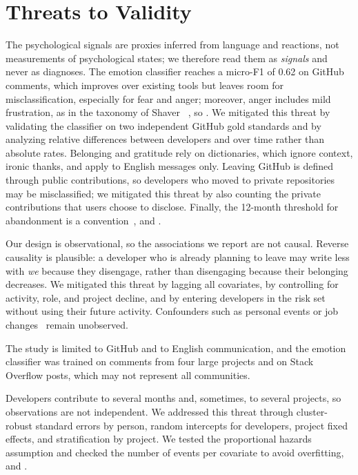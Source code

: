 \section{Threats to Validity}
\label{sec:ttv}
\begin{description}[leftmargin=0.3cm]
\item[Construct Validity.] The psychological signals are proxies inferred from language and reactions, not measurements of psychological states; we therefore read them as \textit{signals} and never as diagnoses. The emotion classifier reaches a micro-F1 of 0.62 on GitHub comments, which improves over existing tools but leaves room for misclassification, especially for fear and anger; moreover, anger includes mild frustration, as in the taxonomy of Shaver \etal~\cite{shaver1987emotion}, so . We mitigated this threat by validating the classifier on two independent GitHub gold standards and by analyzing relative differences between developers and over time rather than absolute rates. Belonging and gratitude rely on dictionaries, which ignore context, \eg ironic thanks, and apply to English messages only. Leaving GitHub is defined through public contributions, so developers who moved to private repositories may be misclassified; we mitigated this threat by also counting the private contributions that users choose to disclose. Finally, the 12-month threshold for abandonment is a convention~\cite{calefato2022will}, and .

\item[Internal Validity.] Our design is observational, so the associations we report are not causal. Reverse causality is plausible: a developer who is already planning to leave may write less with \textit{we} because they disengage, rather than disengaging because their belonging decreases. We mitigated this threat by lagging all covariates, by controlling for activity, role, and project decline, and by entering developers in the risk set without using their future activity. Confounders such as personal events or job changes~\cite{miller2019people} remain unobserved.

\item[External Validity.]  The study is limited to GitHub and to English communication, and the emotion classifier was trained on comments from four large projects and on Stack Overflow posts, which may not represent all communities.

\item[Conclusion Validity.] Developers contribute to several months and, sometimes, to several projects, so observations are not independent. We addressed this threat through cluster-robust standard errors by person, random intercepts for developers, project fixed effects, and stratification by project. We tested the proportional hazards assumption and checked the number of events per covariate to avoid overfitting, and .
\end{description}
